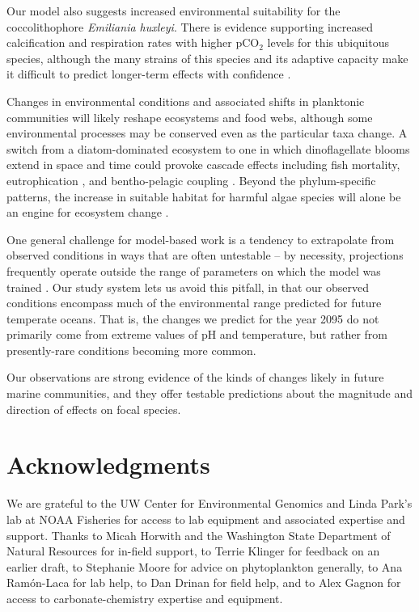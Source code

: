 \documentclass[11pt]{article}
\begin{document}
\begin{linenumbers}
 Our model also suggests increased environmental suitability for the coccolithophore \textit{Emiliania huxleyi}. There is evidence supporting increased calcification and respiration rates with higher pCO$_2$ levels \cite{iglesias2008phytoplankton} for this ubiquitous species, although the many strains of this species and its adaptive capacity make it difficult to predict longer-term effects with confidence \cite{bolton2016decrease}. 
 
 Changes in environmental conditions and associated shifts in planktonic communities will likely reshape ecosystems and food webs, although some environmental processes may be conserved even as the particular taxa change. A switch from a diatom-dominated ecosystem to one in which dinoflagellate blooms extend in space and time could provoke cascade effects \cite{xiao2018warming} including fish mortality, eutrophication \cite{anderson2002harmful}, and bentho-pelagic coupling \citep[][]{bienfang1984sinking}. Beyond the phylum-specific patterns, the increase in suitable habitat for harmful algae species will alone be an engine for ecosystem change \cite{trainer2019pelagic, wells2018harmful}.
  
One general challenge for model-based work is a tendency to extrapolate from observed conditions in ways that are often untestable -- by necessity, projections frequently operate outside the range of parameters on which the model was trained \cite{fitzpatrick2009projection}. Our study system lets us avoid this pitfall, in that our observed conditions encompass much of the environmental range predicted for future temperate oceans. That is, the changes we predict for the year 2095 do not primarily come from extreme values of pH and temperature, but rather from presently-rare conditions becoming more common. 

Our observations are strong evidence of the kinds of changes likely in future marine communities, and they offer testable predictions about the magnitude and direction of effects on focal species. 







\section{Acknowledgments}

 We are grateful to the UW Center for Environmental Genomics and Linda Park's lab at NOAA Fisheries for access to lab equipment and associated expertise and support. Thanks to Micah Horwith and the Washington State Department of Natural Resources for in-field support, to Terrie Klinger for feedback on an earlier draft, to Stephanie Moore for advice on phytoplankton generally, to Ana Ram\'{o}n-Laca for lab help, to Dan Drinan for field help, and to Alex Gagnon for access to carbonate-chemistry expertise and equipment.



 \end{linenumbers}
\end{document}
